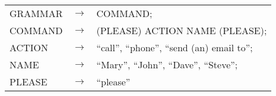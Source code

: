 \documentclass[twocolumn]{bmcart}%
\begin{document}
\begin{table}[!ht]
\begin{tabular}{|lll|} \hline
GRAMMAR & $\rightarrow$ & COMMAND; \\
COMMAND & $\rightarrow$ & (PLEASE) ACTION NAME (PLEASE); \\
ACTION & $\rightarrow$ & ``call'', ``phone'', ``send (an) email to''; \\
NAME & $\rightarrow$ & ``Mary'', ``John'', ``Dave'', ``Steve''; \\ 
PLEASE & $\rightarrow$ & ``please'' \\ \hline
\end{tabular}
\end{table}


\end{document}

